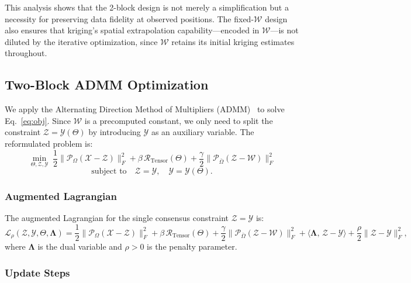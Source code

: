 \documentclass[journal]{IEEEtran}
\newcommand{\Pcal}{\mathcal{P}}
\newcommand{\Xcal}{\mathcal{X}}
\newcommand{\Zcal}{\mathcal{Z}}
\newcommand{\Ycal}{\mathcal{Y}}
\newcommand{\Wcal}{\mathcal{W}}
\newcommand{\Lcal}{\mathcal{L}}
\newcommand{\Rcal}{\mathcal{R}}
\newcommand{\Omegaobs}{\Omega}
\newcommand{\Omegamis}{\bar{\Omega}}
\begin{document}
This analysis shows that the 2-block design is not merely a simplification but a necessity for preserving data fidelity at observed positions. The fixed-$\Wcal$ design also ensures that kriging's spatial extrapolation capability---encoded in $\Wcal$---is not diluted by the iterative optimization, since $\Wcal$ retains its initial kriging estimates throughout.

\subsection{Two-Block ADMM Optimization}\label{sec:admm}

We apply the Alternating Direction Method of Multipliers (ADMM)~\cite{boyd2011distributed} to solve Eq.~\eqref{eq:obj}. Since $\Wcal$ is a precomputed constant, we only need to split the constraint $\Zcal = \Ycal(\Theta)$ by introducing $\Ycal$ as an auxiliary variable. The reformulated problem is:
\begin{equation}\label{eq:reform}
\min_{\Theta, \Zcal, \Ycal}\; \frac{1}{2}\|\Pcal_{\Omegaobs}(\Xcal - \Zcal)\|_{F}^{2} + \beta\,\Rcal_{\mathrm{Tensor}}(\Theta) + \frac{\gamma}{2}\|\Pcal_{\Omegamis}(\Zcal - \Wcal)\|_{F}^{2}
\end{equation}
\begin{equation}\label{eq:reform_constr}
\text{subject to}\quad \Zcal = \Ycal,\quad \Ycal = \Ycal(\Theta).
\end{equation}

\subsubsection{Augmented Lagrangian}

The augmented Lagrangian for the single consensus constraint $\Zcal = \Ycal$ is:
\begin{equation}\label{eq:lag}
\Lcal_{\rho}(\Zcal, \Ycal, \Theta, \boldsymbol{\Lambda}) = \frac{1}{2}\|\Pcal_{\Omegaobs}(\Xcal - \Zcal)\|_{F}^{2} + \beta\,\Rcal_{\mathrm{Tensor}}(\Theta) + \frac{\gamma}{2}\|\Pcal_{\Omegamis}(\Zcal - \Wcal)\|_{F}^{2} + \bigl\langle \boldsymbol{\Lambda},\, \Zcal - \Ycal \bigr\rangle + \frac{\rho}{2}\|\Zcal - \Ycal\|_{F}^{2},
\end{equation}
where $\boldsymbol{\Lambda}$ is the dual variable and $\rho > 0$ is the penalty parameter.

\subsubsection{Update Steps}
\end{document}
